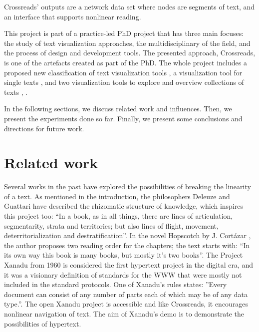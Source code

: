 \documentclass{acm_proc_article-sp}
\begin{document}
Crossreads' outputs are a network data set where nodes are segments
of text, and an interface that supports nonlinear reading.

This project is part of a practice-led PhD project that has three
main focuses: the study of text visualization approaches, the multidisciplinary
of the field, and the process of design and development tools. The
presented approach, Crossreads, is one of the artefacts created as
part of the PhD. The whole project includes a proposed new classification
of text visualization tools \cite{nualart2014we}, a visualization
tool for single texts \cite{nualart_texty_2013}, and two visualization
tools to explore and overview collections of texts \cite{Area_2013_},
\cite{visference_2013_}.

In the following sections, we discuss related work and influences.
Then, we present the experiments done so far. Finally, we present
some conclusions and directions for future work.


\section{Related work}

Several works in the past have explored the possibilities of breaking
the linearity of a text. As mentioned in the introduction, the philosophers
Deleuze and Guattari have described the rhizomatic structure of knowledge,
which inspires this project too: \textquotedblleft{}In a book, as
in all things, there are lines of articulation, segmentarity, strata
and territories; but also lines of flight, movement, deterritorialization
and destratification\textquotedblright{}. In the novel Hopscotch by
J. Cortázar \cite{cortazar1966hopscotch}, the author proposes two
reading order for the chapters; the text starts with: \textquotedblleft{}In
its own way this book is many books, but mostly it's two books\textquotedblright{}.
The Project Xanadu from 1960 \cite{project_xanadu_1960_} is considered
the first hypertext project in the digital era, and it was a visionary
definition of standards for the WWW that were mostly not included
in the standard protocols. One of Xanadu\textquoteright{}s rules states:
\textquotedblright{}Every document can consist of any number of parts
each of which may be of any data type.\textquotedblright{}. The open
Xanadu project is accessible and like Crossreads, it encourages nonlinear
navigation of text. The aim of Xanadu\textquoteright{}s demo is to
demonstrate the possibilities of hypertext.
\end{document}

